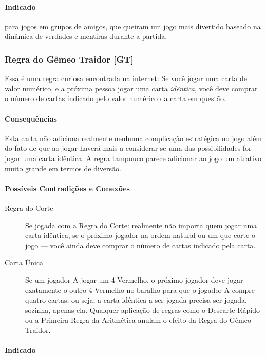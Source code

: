 \paragraph{Indicado} 

para jogos em grupos de amigos, que queiram um jogo mais divertido baseado na dinâmica de verdades e mentiras durante a partida.

\subsubsection{Regra do Gêmeo Traidor [GT]}

Essa é uma regra curiosa encontrada na internet: Se você jogar uma carta de valor numérico, e a próxima pessoa jogar uma carta \emph{idêntica}, você deve comprar o número de cartas indicado pelo valor numérico da carta em questão.

\paragraph{Consequências}

Esta carta não adiciona realmente nenhuma complicação estratégica no jogo além do fato de que ao jogar haverá mais a considerar se uma das possibilidades for jogar uma carta idêntica. A regra tampouco parece adicionar ao jogo um atrativo muito grande em termos de diversão.

\paragraph{Possíveis Contradições e Conexões}

\begin{description}
\item[Regra do Corte]{Se jogada com a Regra do Corte: realmente não importa quem jogar uma carta idêntica, se o próximo jogador na ordem natural ou um que corte o jogo --- você ainda deve comprar o número de cartas indicado pela carta.}
\item[Carta Única]{Se um jogador A jogar um 4 Vermelho, o próximo jogador deve jogar exatamente o outro 4 Vermelho no baralho para que o jogador A compre quatro cartas; ou seja, a carta idêntica a ser jogada precisa ser jogada, sozinha, apenas ela. Qualquer aplicação de regras como o Descarte Rápido ou a Primeira Regra da Aritmética anulam o efeito da Regra do Gêmeo Traidor.}
\end{description}

\paragraph{Indicado} 

